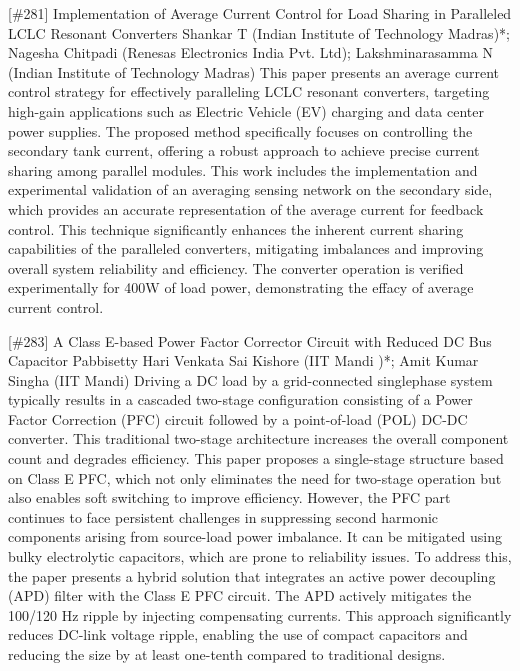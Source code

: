 {} \begin{abstract_online} {[\#281] Implementation of Average Current Control for Load Sharing in Paralleled LCLC Resonant Converters} {} {Shankar T (Indian Institute of Technology Madras)*; Nagesha Chitpadi (Renesas Electronics India Pvt. Ltd); Lakshminarasamma N (Indian Institute of Technology Madras)} {} This paper presents an average current control strategy for effectively paralleling LCLC resonant converters, targeting high-gain applications such as Electric Vehicle (EV) charging and data center power supplies. The proposed method specifically focuses on controlling the secondary tank current, offering a robust approach to achieve precise current sharing among parallel modules. This work includes the implementation and experimental validation of an averaging sensing network on the secondary side, which provides an accurate representation of the average current for feedback control. This technique significantly enhances the inherent current sharing capabilities of the paralleled converters, mitigating imbalances and improving overall system reliability and efficiency. The converter operation is verified experimentally for 400W of load power, demonstrating the effacy of average current control. \end{abstract_online} 
{} \begin{abstract_online} {[\#283] A Class E-based Power Factor Corrector Circuit  with Reduced DC Bus Capacitor} {} {Pabbisetty  Hari Venkata Sai Kishore  (IIT Mandi )*; Amit Kumar Singha (IIT Mandi)} {}  Driving a DC load by a grid-connected singlephase system typically results in a cascaded two-stage configuration consisting of a Power Factor Correction (PFC) circuit followed by a point-of-load (POL) DC-DC converter. This traditional two-stage architecture increases the overall component count and degrades efficiency. This paper proposes a single-stage structure based on Class E PFC, which not only eliminates the need for two-stage operation but also enables soft switching to improve efficiency. However, the PFC part continues to face persistent challenges in suppressing second harmonic components arising from source-load power imbalance. It can be mitigated using bulky electrolytic capacitors, which are prone to reliability issues. To address this, the paper presents a hybrid solution that integrates an active power decoupling (APD) filter with the Class E PFC circuit. The APD actively mitigates the 100/120 Hz ripple by injecting compensating currents. This approach significantly reduces DC-link voltage ripple, enabling the use of compact capacitors and reducing the size by at least one-tenth compared to traditional designs.  \end{abstract_online} 
